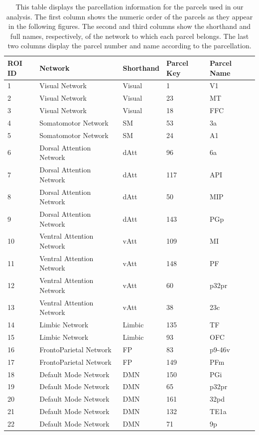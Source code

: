 \begin{table}[ht]
    \centering
    \begin{tabular}{ l | l | l | l | l}
     ROI ID & Network & Shorthand & Parcel Key & Parcel Name\\ 
     \hline
     1 & Visual Network & Visual & 1 & V1\\
     2 & Visual Network & Visual	& 23 & MT\\
     3 & Visual Network & Visual	& 18 & FFC\\
     4 & Somatomotor Network & SM	& 53 & 3a\\
     5 & Somatomotor Network & SM	& 24 & A1\\
     6 & Dorsal Attention Network & dAtt & 96 & 6a\\
     7 & Dorsal Attention Network & dAtt & 117 & API\\
     8 & Dorsal Attention Network & dAtt & 50 & MIP\\
     9 & Dorsal Attention Network & dAtt & 143 & PGp\\
     10 & Ventral Attention Network & vAtt & 109 & MI\\
     11 & Ventral Attention Network & vAtt & 148 & PF\\
     12 & Ventral Attention Network & vAtt & 60 & p32pr\\
     13 & Ventral Attention Network & vAtt & 38 & 23c\\
     14 & Limbic Network & Limbic & 135 & TF\\
     15 & Limbic Network & Limbic & 93 & OFC\\
     16 & FrontoParietal Network & FP & 83 & p9-46v\\
     17 & FrontoParietal Network & FP & 149 & PFm\\
     18 & Default Mode Network & DMN & 150 & PGi\\
     19 & Default Mode Network & DMN & 65 & p32pr\\
     20 & Default Mode Network & DMN & 161 & 32pd\\
     21 & Default Mode Network & DMN & 132 & TE1a\\
     22 & Default Mode Network & DMN & 71 & 9p
    \end{tabular}
    \caption{This table displays the parcellation information for the parcels used in our analysis. The first column shows the numeric order of the parcels as they appear in the following figures. The second and third columns show the shorthand and full names, respectively, of the network to which each parcel belongs. The last two columns display the parcel number and name according to the \cite{glasser} parcellation.}
    \label{fig:roi}
\end{table}

